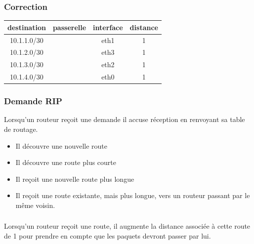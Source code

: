 \documentclass[svgnames,11pt]{beamer}
\begin{document}
\begin{frame}
    \frametitle{Correction}

    \begin{center}
        \begin{tabular}{|*{4}{c|}}
            \hline
            destination    & passerelle & interface & distance \\
            \hline
            10.1.1.0/30    &            & eth1      & 1        \\
            \hline
            10.1.2.0/30    &            & eth3      & 1        \\
            \hline
            10.1.3.0/30    &            & eth2      & 1        \\
            \hline
            10.1.4.0/30    &            & eth0      & 1        \\
            \hline
        \end{tabular}
    \end{center}

\end{frame}
\begin{frame}
    \frametitle{Demande RIP}
    Lorsqu'un routeur reçoit une demande il accuse réception en renvoyant sa table de routage.
    \begin{itemize}
        \item<1-> Il découvre une nouvelle route
        \item<2-> Il découvre une route plus courte
        \item<3-> Il reçoit une nouvelle route plus longue 
        \item<4-> Il reçoit une route existante, mais plus longue, vers un routeur passant par le même voisin. 
    \end{itemize}

\end{frame}

\begin{frame}
    \frametitle{}

    \begin{aretenir}[Remarque]
        Lorsqu’un routeur reçoit une route, il augmente la distance associée à cette route de 1 pour prendre en compte que les paquets devront passer par
        lui.
    \end{aretenir}

\end{frame}
\end{document}
